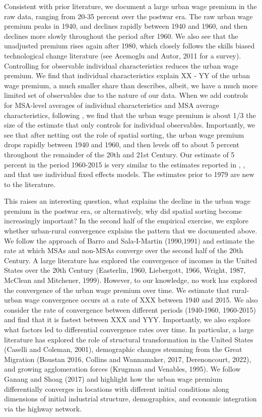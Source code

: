 \documentclass[12pt,twoside]{article}
\begin{document}
Consistent with prior literature, we document a large urban wage premium in the raw data, ranging from 20-35 percent over the postwar era. 
The raw urban wage premium peaks in 1940, and declines rapidly between 1940 and 1960, and then declines more slowly throughout the period after 1960. 
We also see that the unadjusted premium rises again after 1980, which closely follows the skills biased technological change literature (see Acemoglu and Autor, 2011 for a survey).%
Controlling for observable individual characteristics reduces the urban wage premium. 
We find that individual characteristics explain XX - YY of the urban wage premium, a much smaller share than  \citet{Yankow_2006} describes, albeit, we have a much more limited set of observables due to the nature of our data. 
When we add controls for MSA-level averages of individual characteristics and MSA average characteristics, following \citet{altonji2018estimating}, we find that the urban wage premium is about 1/3 the size of the estimate that only controls for individual observables. 
Importantly, we see that after netting out the role of spatial sorting, the urban wage premium drops rapidly between 1940 and 1960, and then levels off to about 5 percent throughout the remainder of the 20th and 21st Century. 
Our estimate of 5 percent in the period 1960-2015 is very similar to the estimates reported in \citet{Baum-Snow_Pavan_2012}, \citet{Glaeser_Mare_2001}, and  \citet{Yankow_2006} that use individual fixed effects models. 
The estimates prior to 1979 are new to the literature. 

This raises an interesting question, what explains the decline in the urban wage premium in the postwar era, or alternatively, why did spatial sorting become increasingly important?
In the second half of the empirical exercise, we explore whether urban-rural convergence explains the pattern that we documented above. 
We follow the approach of Barro and Sala-I-Martin (1990,1991) and estimate the rate at which MSAs and non-MSAs converge over the second half of the 20th Century. 
A large literature has explored the convergence of incomes in the United States over the 20th Century (Easterlin, 1960, Liebergott, 1966, Wright, 1987, McClean and Mitchener, 1999).  
However, to our knowledge, no work has explored the convergence of the urban wage premium over time. 
We estimate that rural-urban wage convergence occurs at a rate of XXX between 1940 and 2015. 
We also consider the rate of convergence between different periods (1940-1960, 1960-2015) and find that it is fastest between XXX and YYY. 
Importantly, we also explore what factors led to differential convergence rates over time. 
In particular, a large literature has explored the role of structural transformation in the United States (Caselli and Coleman, 2001), demographic changes stemming from the Great Migration (Boustan 2016, Collins and Wannamaker, 2017, Derenoncourt, 2022), and growing agglomeration forces (Krugman and Venables, 1995). 
We follow Ganang and Shoag (2017) and highlight how the urban wage premium differentially converges in locations with different initial conditions along dimensions of initial industrial structure, demographics, and economic integration via the highway network. 
\end{document}
